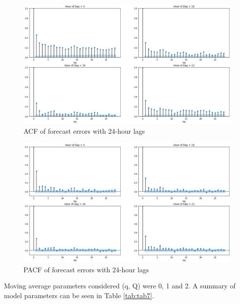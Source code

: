 \documentclass[mstat,12pt]{unswthesis}
\begin{document}
\begin{figure}
\includegraphics[width=1\linewidth,height=0.35\textheight]{images/Stationarity1} \caption{ACF of forecast errors with 24-hour lags}\label{fig:ACF}
\end{figure}

\begin{figure}
\includegraphics[width=1\linewidth,height=0.35\textheight]{images/Stationarity2} \caption{PACF of forecast errors with 24-hour lags}\label{fig:PACF}
\end{figure}

\bigskip

Moving average parameters considered (q, Q) were 0, 1 and 2. A summary of model parameters can be seen in Table \ref{tab:tab7}.

\bigskip
\end{document}

